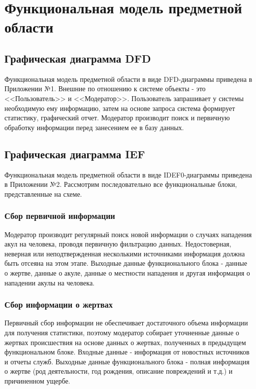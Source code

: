 \documentclass[russian,utf8,simple,emptystyle]{eskdtext}
\begin{document}
\section{Функциональная модель предметной области}
\subsection{Графическая диаграмма DFD}
Функциональная модель предметной области в виде DFD-диаграммы приведена в Приложении №1. Внешние по отношению к системе объекты - это <<Пользователь>> и  <<Модератор>>. Пользователь запрашивает у системы необходимую ему информацию, затем на основе запроса система формирует статистику, графический отчет. Модератор производит поиск и первичную обработку информации перед занесением ее в базу данных.

\subsection{Графическая диаграмма IEF}
Функциональная модель предметной области в виде IDEF0-диаграммы приведена в Приложении №2. Рассмотрим последовательно все функциональные блоки, представленные на схеме.

\subsubsection{Сбор первичной информации}
Модератор производит регулярный поиск новой информации о случаях нападения акул на человека, проводя первичную фильтрацию данных. Недостоверная, неверная или неподтвержденная несколькими источниками информация должна быть отсеяна на этом этапе. Выходные данные функционального блока - данные о жертве, данные о акуле, данные о местности нападения и другая информация о нападении акулы на человека.

\subsubsection{Сбор информации о жертвах}
Первичный сбор информации не обеспечивает достаточного объема информации для получения статистики, поэтому модератор собирает уточненные данные о жертвах происшествия на основе данных о жертвах, полученных в предыдущем функциональном блоке. Входные данные - информация от новостных источников и отчеты служб. Выходные данные функционального блока - полная информация о жертве (род деятельности, год рождения, описание повреждений и т.д.) и причиненном ущербе.
\end{document}
